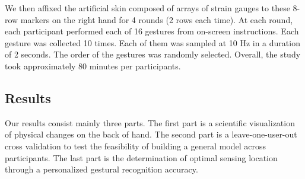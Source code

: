 \documentclass{sigchi}
\begin{document}
We then affixed the artificial skin composed of arrays of strain gauges to these 8-row markers on the right hand for 4 rounds (2 rows each time). 
At each round, each participant performed each of 16 gestures from on-screen instructions. Each gesture was collected 10 times. Each of them was sampled at 10 Hz in a duration of 2 seconds.
The order of the gestures was randomly selected. 
Overall, the study took approximately 80 minutes per participants.

\subsection{Results}



Our results consist mainly three parts. The first part is a scientific visualization of physical changes on the back of hand. The second part is a leave-one-user-out cross validation to test the feasibility of building a general model across participants. The last part is the determination of optimal sensing location through a personalized gestural recognition accuracy.
\end{document}
